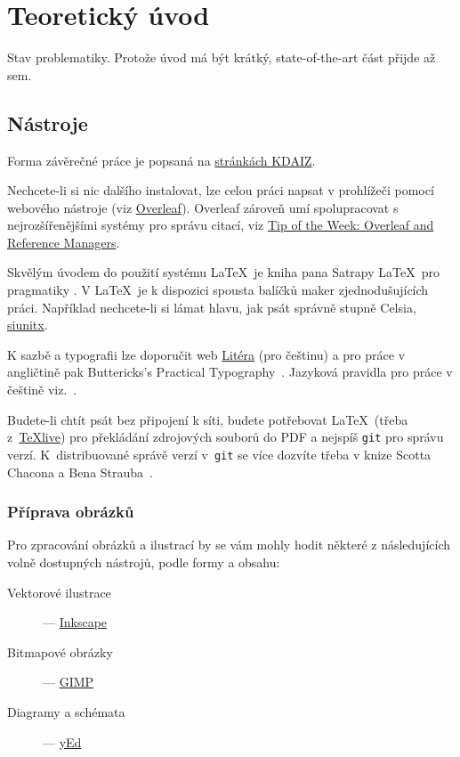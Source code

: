 \chapter{Teoretický úvod}
\label{sec:teorie}

\noindent Stav problematiky. Protože úvod má být krátký, state-of-the-art část přijde až sem.

\section{Nástroje}
\label{sec:nastroje}

Forma závěrečné práce je popsaná na \href{ https://kdaiz.fjfi.cvut.cz/studium/bakalarske-studium/bakalarska-prace/}{stránkách KDAIZ}.

Nechcete-li si nic dalšího instalovat, lze celou práci napsat v prohlížeči pomocí webového nástroje (viz \href{https://overleaf.com}{Overleaf}). Overleaf zároveň umí spolupracovat s nejrozšířenějšími systémy pro správu citací, viz \href{https://www.overleaf.com/blog/639-tip-of-the-week-overleaf-and-reference-managers}{Tip of the Week: Overleaf and Reference Managers}. 

Skvělým úvodem do použití systému \LaTeX\ je kniha pana Satrapy \LaTeX\ pro pragmatiky \cite{satrapa_latex_2011}.
V \LaTeX\ je k dispozici spousta balíčků maker zjednodušujících práci. Například nechcete-li si lámat hlavu, jak psát správně stupně Celsia,  \href{https://texdoc.org/serve/siunitx/0}{siunitx}.

K sazbě a typografii lze doporučit web \href{http://www.liteera.cz}{Litéra} (pro češtinu) a pro práce v angličtině pak Buttericks's Practical Typography~\cite{butterick_matthew_buttericks_nodate}. 
Jazyková pravidla pro práce v češtině viz.~\cite{ijp}.

Budete-li chtít psát bez připojení k síti, budete potřebovat \LaTeX\ (třeba z~\href{https://tug.org/texlive/}{TeXlive}) pro překládání zdrojových souborů do PDF a nejspíš \verb?git? pro správu verzí. K~distribuované správě verzí v~\verb?git? se více dozvíte třeba v knize Scotta Chacona a Bena Strauba~\cite{chacon_pro_2014}.

\subsection{Příprava obrázků}
\label{sec:obrazky}

Pro zpracování obrázků a ilustrací by se vám mohly hodit některé z následujících volně dostupných nástrojů, podle formy a obsahu:
\begin{description}
\item[Vektorové ilustrace] --- \href{https://inkscape.org/cs/}{Inkscape}
\item[Bitmapové obrázky] --- \href{https://gimp.org/}{GIMP}
\item[Diagramy a schémata] --- \href{https://www.yworks.com/products/yed}{yEd}
\end{description}

